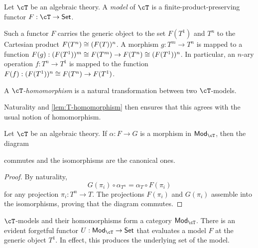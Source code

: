 \documentclass{amsart}
\begin{document}
\begin{defn}
  Let $\cT$ be an algebraic theory.
  A \emph{model} of $\cT$ is a finite-product-preserving functor $F : \cT \to \mathsf{Set}$.
\end{defn}

Such a functor $F$ carries the generic object to the set $F(T^{1})$ and $T^{n}$ to the Cartesian product $F(T^{n}) \cong (F(T))^{n}$.
A morphism $g : T^{m} \to T^{n}$ is mapped to a function $F(g) : (F(T^{1}))^{m} \cong F(T^{m}) \to F(T^{n}) \cong (F(T^{1}))^{n}$.
In particular, an $n$-ary operation $f : T^{n} \to T^{1}$ is mapped to the function $F(f) : (F(T^{1}))^{n} \cong F(T^{n}) \to F(T^{1})$.

\begin{defn}
  A \emph{$\cT$-homomorphism} is a natural transformation between two $\cT$-models.
\end{defn}

Naturality and \cref{lem:T-homomorphism} then ensures that this agrees with the usual notion of homomorphism.


\begin{lem}\label{lem:T-homomorphism}
  Let $\cT$ be an algebraic theory.
  If $\alpha : F \to G$ is a morphism in $\mathsf{Mod}_{\cT}$, then the diagram
  
  commutes and the isomorphisms are the canonical ones.
\end{lem}
\begin{proof}
  By naturality,
  \[
    G(\pi_{i}) \circ \alpha_{T^{n}} = \alpha_{T} \circ F(\pi_{i})
  \]
  for any projection $\pi_{i} : T^{n} \to T$.
  The projections $F(\pi_{i})$ and $G(\pi_{i})$ assemble into the isomorphisms, proving that the diagram commutes.
\end{proof}

$\cT$-models and their homomorphisms form a category $\mathsf{Mod}_{\cT}$.
There is an evident forgetful functor $U : \mathsf{Mod}_{\cT} \to \mathsf{Set}$ that evaluates a model $F$ at the generic object $T^{1}$.
In effect, this produces the underlying set of the model.
\end{document}
